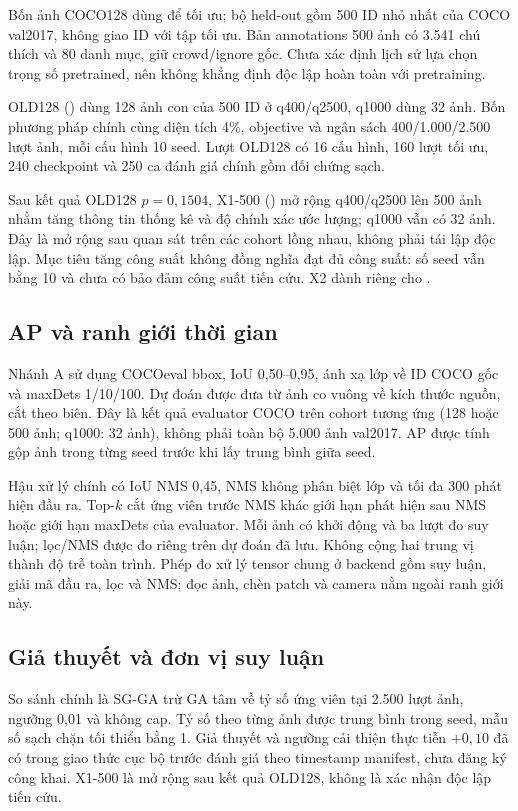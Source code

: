 \documentclass[a4paper,fleqn]{cas-dc}
\begin{document}
Bốn ảnh COCO128 dùng để tối ưu; bộ held-out gồm 500 ID nhỏ nhất của COCO val2017, không giao ID với tập tối ưu. Bản annotations 500 ảnh có 3.541 chú thích và 80 danh mục, giữ crowd/ignore gốc. Chưa xác định lịch sử lựa chọn trọng số pretrained, nên không khẳng định độc lập hoàn toàn với pretraining.

OLD128 () dùng 128 ảnh con của 500 ID ở q400/q2500, q1000 dùng 32 ảnh. Bốn phương pháp chính cùng diện tích 4\%, objective và ngân sách 400/1.000/2.500 lượt ảnh, mỗi cấu hình 10 seed. Lượt OLD128 có 16 cấu hình, 160 lượt tối ưu, 240 checkpoint và 250 ca đánh giá chính gồm đối chứng sạch.

Sau kết quả OLD128 $p=0{,}1504$, X1-500 () mở rộng q400/q2500 lên 500 ảnh nhằm tăng thông tin thống kê và độ chính xác ước lượng; q1000 vẫn có 32 ảnh. Đây là mở rộng sau quan sát trên các cohort lồng nhau, không phải tái lập độc lập. Mục tiêu tăng công suất không đồng nghĩa đạt đủ công suất: số seed vẫn bằng 10 và chưa có bảo đảm công suất tiến cứu. X2 dành riêng cho .

\subsection{AP và ranh giới thời gian}

Nhánh A sử dụng COCOeval bbox, IoU 0,50--0,95, ánh xạ lớp về ID COCO gốc và maxDets 1/10/100. Dự đoán được đưa từ ảnh co vuông về kích thước nguồn, cắt theo biên. Đây là kết quả evaluator COCO trên cohort tương ứng (128 hoặc 500 ảnh; q1000: 32 ảnh), không phải toàn bộ 5.000 ảnh val2017. AP được tính gộp ảnh trong từng seed trước khi lấy trung bình giữa seed.

Hậu xử lý chính có IoU NMS 0,45, NMS không phân biệt lớp và tối đa 300 phát hiện đầu ra. Top-$k$ cắt ứng viên trước NMS khác giới hạn phát hiện sau NMS hoặc giới hạn maxDets của evaluator. Mỗi ảnh có khởi động và ba lượt đo suy luận; lọc/NMS được đo riêng trên dự đoán đã lưu. Không cộng hai trung vị thành độ trễ toàn trình. Phép đo xử lý tensor chung ở backend gồm suy luận, giải mã đầu ra, lọc và NMS; đọc ảnh, chèn patch và camera nằm ngoài ranh giới này.

\subsection{Giả thuyết và đơn vị suy luận}
So sánh chính là SG-GA trừ GA tâm về tỷ số ứng viên tại 2.500 lượt ảnh, ngưỡng 0,01 và không cap. Tỷ số theo từng ảnh được trung bình trong seed, mẫu số sạch chặn tối thiểu bằng 1. Giả thuyết và ngưỡng cải thiện thực tiễn $+0{,}10$ đã có trong giao thức cục bộ trước đánh giá theo timestamp manifest, chưa đăng ký công khai. X1-500 là mở rộng sau kết quả OLD128, không là xác nhận độc lập tiến cứu.
\end{document}
